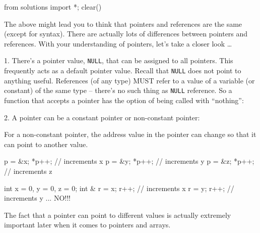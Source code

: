 \begin{python0}
from solutions import *; clear()
\end{python0}

The above might lead you to think that pointers and references are the same (except for syntax). There are actually lots of differences between pointers and references. With your understanding of pointers, let's take a closer look \ldots

1. There's a pointer value, \texttt{NULL}, that can be assigned to all pointers. This frequently acts as a default pointer value. Recall that \texttt{NULL} does not point to anything useful. References (of any type) MUST refer to a value of a variable (or constant) of the same type -- there's no such thing as \texttt{NULL} reference. So a function that accepts a pointer has the option of being called with ``nothing'':

2. A pointer can be a constant pointer or non-constant pointer:


For a non-constant pointer, the address value in the pointer can change so that it can point to another value.

\begin{consolethree}[escapeinside=||]
p = &x; *p++; // increments x
p = &y; *p++; // increments y
p = &z; *p++; // increments z
\end{consolethree}

\begin{consolethree}[escapeinside=||]
int x = 0, y = 0, z = 0;
int & r = x; r++;           // increments x
r = y; r++;                 // increments y ... NO!!!
\end{consolethree}
The fact that a pointer can point to different values is actually extremely important later when it comes to pointers and arrays.

